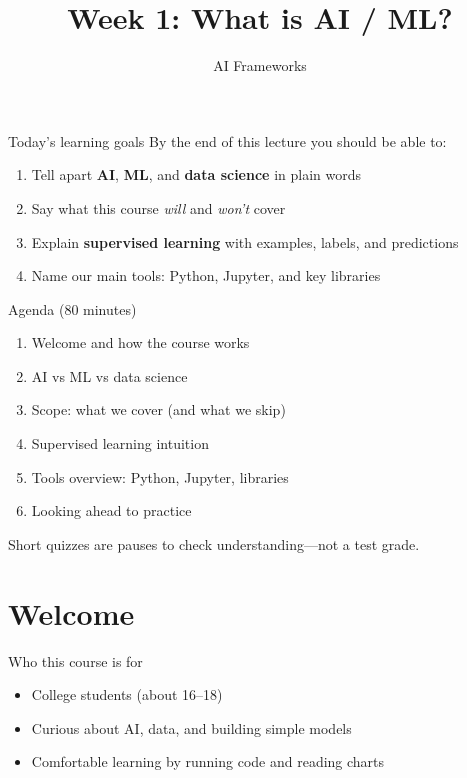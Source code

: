 \documentclass[aspectratio=169,11pt]{beamer}
\title{Week 1: What is AI / ML?}
\subtitle{AI Frameworks}
\begin{document}
    \begin{frame}
        \titlepage
    \end{frame}

    \begin{frame}{Today's learning goals}
        By the end of this lecture you should be able to:
        \begin{enumerate}
            \item Tell apart \textbf{AI}, \textbf{ML}, and \textbf{data science} in plain words
            \item Say what this course \emph{will} and \emph{won't} cover
            \item Explain \textbf{supervised learning} with examples, labels, and predictions
            \item Name our main tools: Python, Jupyter, and key libraries
        \end{enumerate}
    \end{frame}

    \begin{frame}{Agenda (80 minutes)}
        \begin{enumerate}
            \item Welcome and how the course works
            \item AI vs ML vs data science
            \item Scope: what we cover (and what we skip)
            \item Supervised learning intuition
            \item Tools overview: Python, Jupyter, libraries
            \item Looking ahead to practice
        \end{enumerate}
        \vspace{0.5em}
        Short quizzes are pauses to check understanding---not a test grade.
    \end{frame}

    \section{Welcome}

    \begin{frame}{Who this course is for}
        \begin{itemize}
            \item College students (about 16--18)
            \item Curious about AI, data, and building simple models
            \item Comfortable learning by running code and reading charts
        \end{itemize}
        \vspace{0.6em}
    \end{frame}
\end{document}
